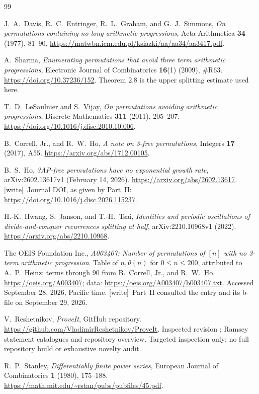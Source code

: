 \documentclass[11pt,a4paper]{article}
\numberwithin{equation}{section}
\theoremstyle{definition}
\theoremstyle{remark}
\newcommand{\code}[1]{\texttt{\detokenize{#1}}}
\newcommand{\wtag}{\textup{[write]}}
\theoremstyle{definition}
\theoremstyle{plain}
\begin{document}
\begin{thebibliography}{99}
\raggedright
{}
J.~A.~Davis, R.~C.~Entringer, R.~L.~Graham, and G.~J.~Simmons,
\emph{On permutations containing no long arithmetic progressions},
Acta Arithmetica \textbf{34} (1977), 81--90.
\url{https://matwbn.icm.edu.pl/ksiazki/aa/aa34/aa3417.pdf}.

A.~Sharma,
\emph{Enumerating permutations that avoid three term arithmetic progressions},
Electronic Journal of Combinatorics \textbf{16}(1) (2009), \#R63.
\url{https://doi.org/10.37236/152}.
Theorem 2.8 is the upper splitting estimate used here.

T.~D.~LeSaulnier and S.~Vijay,
\emph{On permutations avoiding arithmetic progressions},
Discrete Mathematics \textbf{311} (2011), 205--207.
\url{https://doi.org/10.1016/j.disc.2010.10.006}.

B.~Correll, Jr., and R.~W.~Ho,
\emph{A note on 3-free permutations},
Integers \textbf{17} (2017), A55.
\url{https://arxiv.org/abs/1712.00105}.

B.~S.~Ho,
\emph{3AP-free permutations have no exponential growth rate},
arXiv:2602.13617v1 (February 14, 2026).
\url{https://arxiv.org/abs/2602.13617}.
\wtag\ Journal DOI, as given by Part~II:
\url{https://doi.org/10.1016/j.disc.2026.115237}.

H.-K.~Hwang, S.~Janson, and T.-H.~Tsai,
\emph{Identities and periodic oscillations of divide-and-conquer recurrences
splitting at half}, arXiv:2210.10968v1 (2022).
\url{https://arxiv.org/abs/2210.10968}.

The OEIS Foundation Inc., \emph{A003407: Number of permutations of $[n]$
with no 3-term arithmetic progression}.
Table of $n,\theta(n)$ for $0\le n\le200$, attributed to A.~P.~Heinz;
terms through $90$ from B.~Correll, Jr., and R.~W.~Ho.
\url{https://oeis.org/A003407}; data:
\url{https://oeis.org/A003407/b003407.txt}.
Accessed September 28, 2026, Pacific time.
\wtag\ Part~II consulted the entry and its b-file on September 29, 2026.

V.~Reshetnikov, \emph{ProveIt}, GitHub repository.
\url{https://github.com/VladimirReshetnikov/ProveIt}.
Inspected revision
\code{74f7f5bdba1aa728b340509701a0fa4e45e8dbf3};
Ramsey statement catalogues and repository overview. Targeted inspection only;
no full repository build or exhaustive novelty audit.

R.~P.~Stanley, \emph{Differentiably finite power series},
European Journal of Combinatorics \textbf{1} (1980), 175--188.
\url{https://math.mit.edu/~rstan/pubs/pubfiles/45.pdf}.


\end{thebibliography}
\end{document}
